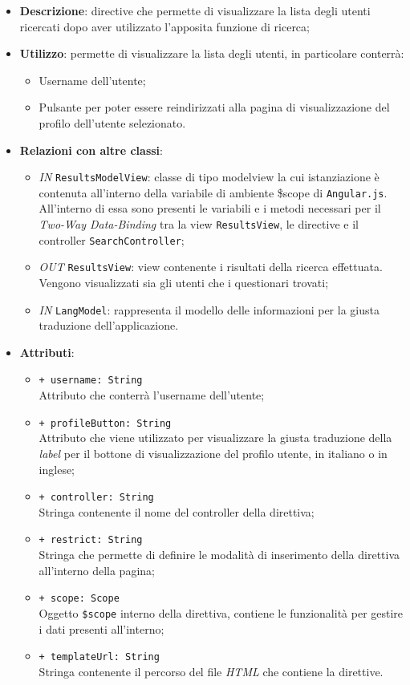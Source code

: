 \begin{itemize}
	\item \textbf{Descrizione}: directive che permette di visualizzare la lista degli utenti ricercati dopo aver utilizzato l'apposita funzione di ricerca;
	\item \textbf{Utilizzo}: permette di visualizzare la lista degli utenti, in particolare conterrà:
	\begin{itemize}
		\item Username dell'utente;
		\item Pulsante per poter essere reindirizzati alla pagina di visualizzazione del profilo dell'utente selezionato.
	\end{itemize}
	\item \textbf{Relazioni con altre classi}:
	\begin{itemize}
		\item \textit{IN} \texttt{ResultsModelView}: classe di tipo modelview la cui istanziazione è contenuta all'interno della variabile di ambiente \$scope di \texttt{Angular.js}. All'interno di essa sono presenti le variabili e i metodi necessari per il \textit{Two-Way Data-Binding} tra la view \texttt{ResultsView}, le directive e il controller \texttt{SearchController};
		\item \textit{OUT} \texttt{ResultsView}: view contenente i risultati della ricerca effettuata. Vengono visualizzati sia gli utenti che i questionari trovati;
		\item \textit{IN} \texttt{LangModel}: rappresenta il modello delle informazioni per la giusta traduzione dell'applicazione.
	\end{itemize}
	\item \textbf{Attributi}:
	\begin{itemize}
		\item \texttt{+ username: String} \\ Attributo che conterrà l'username dell'utente;
		\item \texttt{+ profileButton: String} \\ Attributo che viene utilizzato per visualizzare la giusta traduzione della \textit{label} per il bottone di visualizzazione del profilo utente, in italiano o in inglese;
		\item \texttt{+ controller: String} \\ Stringa contenente il nome del controller della direttiva;
		\item \texttt{+ restrict: String} \\ Stringa che permette di definire le modalità di inserimento della direttiva all'interno della pagina;
		\item \texttt{+ scope: Scope} \\Oggetto \texttt{\$scope} interno della direttiva, contiene le funzionalità per gestire i dati presenti all'interno;
		\item \texttt{+ templateUrl: String} \\ Stringa contenente il percorso del file \textit{HTML} che contiene la direttive.
	\end{itemize}
\end{itemize}
